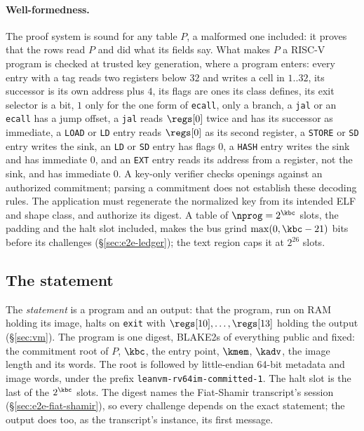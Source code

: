 \paragraph{Well-formedness.} The proof system is sound for any table $P$, a malformed one included: it proves that the rows read $P$ and did what its fields say. What makes $P$ a RISC-V program is checked at trusted key generation, where a program enters: every entry with a tag reads two registers below $32$ and writes a cell in $1..32$, its successor is its own address plus $4$, its flags are ones its class defines, its exit selector is a bit, $1$ only for the one form of \texttt{ecall}, only a branch, a \texttt{jal} or an \texttt{ecall} has a jump offset, a \texttt{jal} reads $\regs[0]$ twice and has its successor as immediate, a \texttt{LOAD} or \texttt{LD} entry reads $\regs[0]$ as its second register, a \texttt{STORE} or \texttt{SD} entry writes the sink, an \texttt{LD} or \texttt{SD} entry has flags $0$, a \texttt{HASH} entry writes the sink and has immediate $0$, and an \texttt{EXT} entry reads its address from a register, not the sink, and has immediate $0$. A key-only verifier checks openings against an authorized commitment; parsing a commitment does not establish these decoding rules. The application must regenerate the normalized key from its intended ELF and shape class, and authorize its digest. A table of $\nprog=2^{\kbc}$ slots, the padding and the halt slot included, makes the bus grind $\max(0,\kbc-21)$ bits before its challenges (\S\ref{sec:e2e-ledger}); the text region caps it at $2^{26}$ slots.

\subsection{The statement}\label{sec:e2e-pi}

The \emph{statement} is a program and an output: that the program, run on RAM holding its image, halts on \texttt{exit} with $\regs[10],\dots,\regs[13]$ holding the output (\S\ref{sec:vm}). The program is one digest, BLAKE2s of everything public and fixed: the commitment root of $P$, $\kbc$, the entry point, $\kmem$, $\kadv$, the image length and its words. The root is followed by little-endian 64-bit metadata and image words, under the prefix \texttt{leanvm-rv64im-committed-1}. The halt slot is the last of the $2^{\kbc}$ slots. The digest names the Fiat-Shamir transcript's session (\S\ref{sec:e2e-fiat-shamir}), so every challenge depends on the exact statement; the output does too, as the transcript's instance, its first message.

